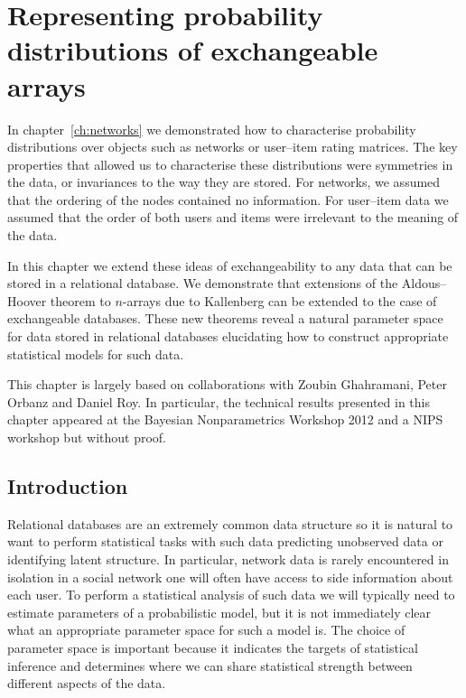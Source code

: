 
\inbpdocument

\chapter{Representing probability distributions of exchangeable arrays}
\label{ch:arrays}

In chapter~\ref{ch:networks} we demonstrated how to characterise probability distributions over objects such as networks or user--item rating matrices.
The key properties that allowed us to characterise these distributions were symmetries in the data, or invariances to the way they are stored.
For networks, we assumed that the ordering of the nodes contained no information.
For user--item data we assumed that the order of both users and items were irrelevant to the meaning of the data.

In this chapter we extend these ideas of exchangeability to any data that can be stored in a relational database.
We demonstrate that extensions of the Aldous--Hoover theorem to $n$-arrays due to Kallenberg \citep{Kallenberg1999-pj} can be extended to the case of exchangeable databases.
These new theorems reveal a natural parameter space for data stored in relational databases elucidating how to construct appropriate statistical models for such data.

This chapter is largely based on collaborations with Zoubin Ghahramani, Peter Orbanz and Daniel Roy.
In particular, the technical results presented in this chapter appeared at the Bayesian Nonparametrics Workshop 2012 and a NIPS workshop \citep{Lloyd_undated-iu} but without proof.

\section{Introduction}

Relational databases are an extremely common data structure so it is natural to want to perform statistical tasks with such data \eg predicting unobserved data or identifying latent structure.
In particular, network data is rarely encountered in isolation \eg in a social network one will often have access to side information about each user.
To perform a statistical analysis of such data we will typically need to estimate parameters of a probabilistic model, but it is not immediately clear what an appropriate parameter space for such a model is.
The choice of parameter space is important because it indicates the targets of statistical inference and determines where we can share statistical strength between different aspects of the data.

